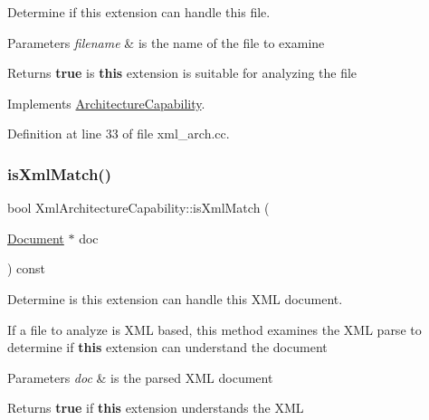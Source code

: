 Determine if this extension can handle this file. 


\begin{DoxyParams}{Parameters}
{\em filename} & is the name of the file to examine \\
\hline
\end{DoxyParams}
\begin{DoxyReturn}{Returns}
{\bfseries{true}} is {\bfseries{this}} extension is suitable for analyzing the file 
\end{DoxyReturn}


Implements \mbox{\hyperlink{class_architecture_capability_aa3d4fed15e42f3e853851babaf379376}{Architecture\+Capability}}.



Definition at line 33 of file xml\+\_\+arch.\+cc.

\mbox{\label{class_xml_architecture_capability_ab834c8722ce6813e4b5cf34a207b0f52}} 
\subsubsection{\texorpdfstring{isXmlMatch()}{isXmlMatch()}}
{\footnotesize\ttfamily bool Xml\+Architecture\+Capability\+::is\+Xml\+Match (\begin{DoxyParamCaption}\item[{\mbox{\hyperlink{class_document}{Document}} $\ast$}]{doc }\end{DoxyParamCaption}) const\hspace{0.3cm}{\ttfamily [virtual]}}



Determine is this extension can handle this X\+ML document. 

If a file to analyze is X\+ML based, this method examines the X\+ML parse to determine if {\bfseries{this}} extension can understand the document 
\begin{DoxyParams}{Parameters}
{\em doc} & is the parsed X\+ML document \\
\hline
\end{DoxyParams}
\begin{DoxyReturn}{Returns}
{\bfseries{true}} if {\bfseries{this}} extension understands the X\+ML 
\end{DoxyReturn}


